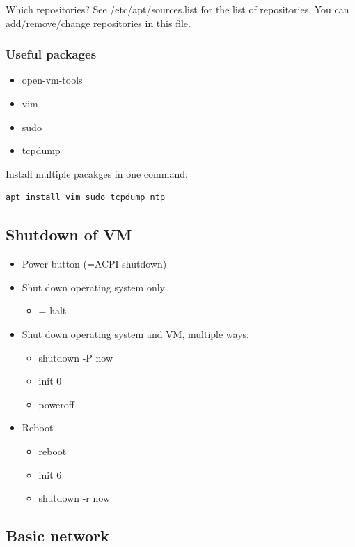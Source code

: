 \documentclass{article}
\begin{document}
Which repositories? See /etc/apt/sources.list for the list of repositories. You can add/remove/change repositories in this file.

\subsubsection{Useful packages}

\begin{itemize}
    \item open-vm-tools
    \item vim
    \item sudo
    \item tcpdump
\end{itemize}

Install multiple pacakges in one command: 

\begin{verbatim}
apt install vim sudo tcpdump ntp
\end{verbatim}

\subsection{Shutdown of VM}

\begin{itemize}
    \item Power button (=ACPI shutdown)
    \item Shut down operating system only
    \begin{itemize}
        \item = halt
    \end{itemize}
    \item Shut down operating system and VM, multiple ways:
    \begin{itemize}
        \item shutdown -P now
        \item init 0
        \item poweroff
    \end{itemize}
    \item Reboot
    \begin{itemize}
        \item reboot
        \item init 6
        \item shutdown -r now
    \end{itemize}
\end{itemize}

\subsection{Basic network}
\end{document}
